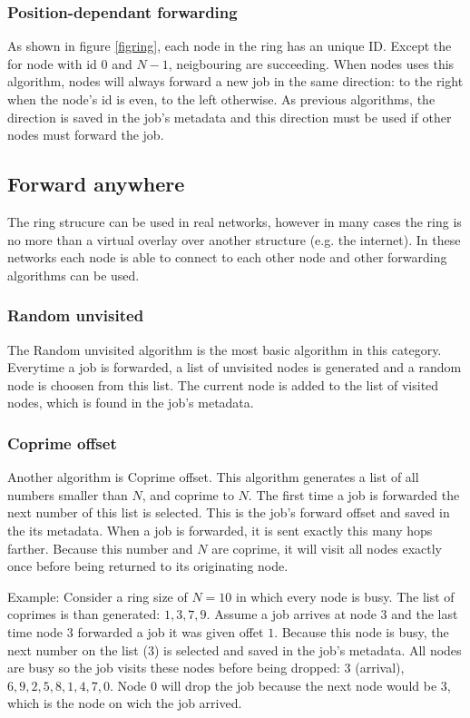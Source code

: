 \documentclass[10pt,a4paper]{article}
\begin{document}
\subsubsection{Position-dependant forwarding}
As shown in figure \ref{figring}, each node in the ring has an unique ID. Except the for node with id $0$ and $N-1$, neigbouring are succeeding. When nodes uses this algorithm, nodes will always forward a new job in the same direction: to the right when the node's id is even, to the left otherwise. As previous algorithms, the direction is saved in the job's metadata and this direction must be used if other nodes must forward the job.

\subsection{Forward anywhere}
The ring strucure can be used in real networks, however in many cases the ring is no more than a virtual overlay over another structure (e.g. the internet). In these networks each node is able to connect to each other node and other forwarding algorithms can be used.

\subsubsection{Random unvisited}
The Random unvisited algorithm is the most basic algorithm in this category. Everytime a job is forwarded, a list of unvisited nodes is generated and a random node is choosen from this list. The current node is added to the list of visited nodes, which is found in the job's metadata.

\subsubsection{Coprime offset}
Another algorithm is Coprime offset. This algorithm generates a list of all numbers smaller than $N$, and coprime to $N$. The first time a job is forwarded the next number of this list is selected. This is the job's forward offset and saved in the its metadata. When a job is forwarded, it is sent exactly this many hops farther. Because this number and $N$ are coprime, it will visit all nodes exactly once before being returned to its originating node. 

Example:
Consider a ring size of $N=10$ in which every node is busy. The list of coprimes is than generated: ${1, 3, 7, 9}$. Assume a job arrives at node $3$ and the last time node $3$ forwarded a job it was given offet $1$.
Because this node is busy, the next number on the list ($3$) is selected and saved in the job's metadata. All nodes are busy so the job visits these nodes before being dropped: $3$ (arrival), $6, 9, 2, 5, 8, 1, 4, 7, 0$. Node $0$ will drop the job because the next node would be $3$, which is the node on wich the job arrived.
\end{document}
